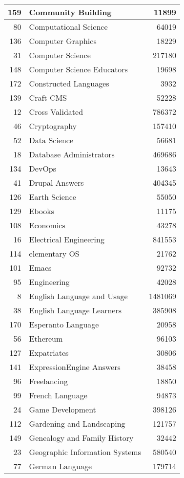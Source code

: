 \documentclass[]{book}
\theoremstyle{definition}
\theoremstyle{definition}
\theoremstyle{definition}
\theoremstyle{remark}
\begin{document}
\begin{tabular}{r|l|r}
\hline
159 & Community Building & 11899\\
\hline
80 & Computational Science & 64019\\
\hline
136 & Computer Graphics & 18229\\
\hline
31 & Computer Science & 217180\\
\hline
148 & Computer Science Educators & 19698\\
\hline
172 & Constructed Languages & 3932\\
\hline
139 & Craft CMS & 52228\\
\hline
12 & Cross Validated & 786372\\
\hline
46 & Cryptography & 157410\\
\hline
52 & Data Science & 56681\\
\hline
18 & Database Administrators & 469686\\
\hline
134 & DevOps & 13643\\
\hline
41 & Drupal Answers & 404345\\
\hline
126 & Earth Science & 55050\\
\hline
129 & Ebooks & 11175\\
\hline
108 & Economics & 43278\\
\hline
16 & Electrical Engineering & 841553\\
\hline
114 & elementary OS & 21762\\
\hline
101 & Emacs & 92732\\
\hline
95 & Engineering & 42028\\
\hline
8 & English Language and Usage & 1481069\\
\hline
38 & English Language Learners & 385908\\
\hline
170 & Esperanto Language & 20958\\
\hline
56 & Ethereum & 96103\\
\hline
127 & Expatriates & 30806\\
\hline
141 & ExpressionEngine Answers & 38458\\
\hline
96 & Freelancing & 18850\\
\hline
99 & French Language & 94873\\
\hline
24 & Game Development & 398126\\
\hline
112 & Gardening and Landscaping & 121757\\
\hline
149 & Genealogy and Family History & 32442\\
\hline
23 & Geographic Information Systems & 580540\\
\hline
77 & German Language & 179714\\

\end{tabular}
\end{document}
